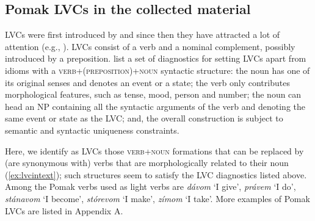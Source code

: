 \documentclass[output=paper,colorlinks,citecolor=brown]{langscibook}
\begin{document}
\subsection{Pomak LVCs in the collected material }
\label{sec:lvcs}

LVCs were first introduced by \citet{jespersen} and since then they have attracted a lot of attention (e.g., \cite{kimbaldwin,laport}). LVCs consist of a verb and a nominal complement, possibly introduced by a preposition.  \citet{SavaryEtAl:18} list a set of diagnostics for setting LVCs apart from idioms with a \textsc{verb+(preposition)+noun} syntactic structure: the noun has one of its original senses and denotes an event or a state; the verb only contributes morphological features, such as tense, mood, person and number; the noun can head an NP containing all the syntactic arguments of the verb and denoting the same event or state as the LVC; and, the overall construction is subject to semantic and syntactic uniqueness constraints.  


Here, we identify as LVCs those \textsc{verb+noun} formations that can be replaced by (are synonymous with)  verbs that are morphologically related to their noun (\ref{ex:lvcintext}); such structures seem to satisfy the LVC diagnostics listed above. Among the Pomak verbs used as light verbs are \textit{dávom} `Ι give', \textit{právem} `Ι do', \textit{stánavom} `Ι become', \textit{stórevom} `Ι make', \textit{zímom} `Ι take'. More examples of Pomak LVCs are listed in Appendix A. 
\end{document}
